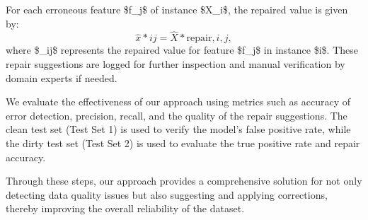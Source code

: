 For each erroneous feature \$f\_j\$ of instance \$X\_i\$, the repaired value is given by:
\begin{equation}
\hat{x}*{ij} = \hat{X}*{\text{repair}, i, j},
\end{equation}
where \$\_{ij}\$ represents the repaired value for feature \$f\_j\$ in instance \$i\$. These repair suggestions are logged for further inspection and manual verification by domain experts if needed.

We evaluate the effectiveness of our approach using metrics such as accuracy of error detection, precision, recall, and the quality of the repair suggestions. The clean test set (Test Set 1) is used to verify the model's false positive rate, while the dirty test set (Test Set 2) is used to evaluate the true positive rate and repair accuracy.

Through these steps, our approach provides a comprehensive solution for not only detecting data quality issues but also suggesting and applying corrections, thereby improving the overall reliability of the dataset.